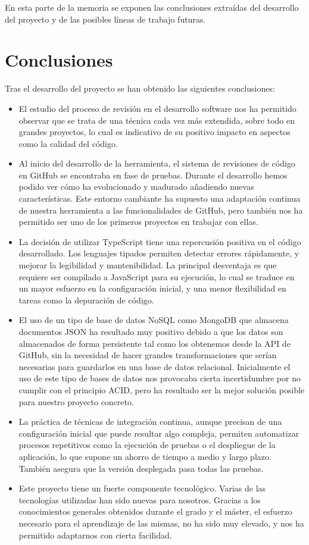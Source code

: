 
En esta parte de la memoria se exponen las conclusiones extraídas del desarrollo del proyecto y de las posibles líneas de trabajo futuras.

\section{Conclusiones}

Tras el desarrollo del proyecto se han obtenido las siguientes conclusiones:

\begin{itemize}
	\item El estudio del proceso de revisión en el desarrollo software nos ha permitido observar que se trata de una técnica cada vez más extendida, sobre todo en grandes proyectos, lo cual es indicativo de su positivo impacto en aspectos como la calidad del código.
	\item Al inicio del desarrollo de la herramienta, el sistema de revisiones de código en GitHub se encontraba en fase de pruebas. Durante el desarrollo hemos podido ver cómo ha evolucionado y madurado añadiendo nuevas características. Este entorno cambiante ha supuesto una adaptación continua de nuestra herramienta a las funcionalidades de GitHub, pero también nos ha permitido ser uno de los primeros proyectos en trabajar con ellas.
	\item La decisión de utilizar TypeScript tiene una repercusión positiva en el código desarrollado. Los lenguajes tipados permiten detectar errores rápidamente, y mejorar la legibilidad y mantenibilidad. La principal desventaja es que requiere ser compilado a JavaScript para su ejecución, lo cual se traduce en un mayor esfuerzo en la configuración inicial, y una menor flexibilidad en tareas como la depuración de código.
	\item El uso de un tipo de base de datos NoSQL como MongoDB que almacena documentos JSON ha resultado muy positivo debido a que los datos son almacenados de forma persistente tal como los obtenemos desde la API de GitHub, sin la necesidad de hacer grandes transformaciones que serían necesarias para guardarlos en una base de datos relacional. Inicialmente el uso de este tipo de bases de datos nos provocaba cierta incertidumbre por no cumplir con el principio ACID, pero ha resultado ser la mejor solución posible para nuestro proyecto concreto.
	\item La práctica de técnicas de integración continua, aunque precisan de una configuración inicial que puede resultar algo compleja, permiten automatizar procesos repetitivos como la ejecución de pruebas o el despliegue de la aplicación, lo que supone un ahorro de tiempo a medio y largo plazo. También asegura que la versión desplegada pasa todas las pruebas.
	\item Este proyecto tiene un fuerte componente tecnológico. Varias de las tecnologías utilizadas han sido nuevas para nosotros. Gracias a los conocimientos generales obtenidos durante el grado y el máster, el esfuerzo necesario para el aprendizaje de las mismas, no ha sido muy elevado, y nos ha permitido adaptarnos con cierta facilidad.
\end{itemize}

